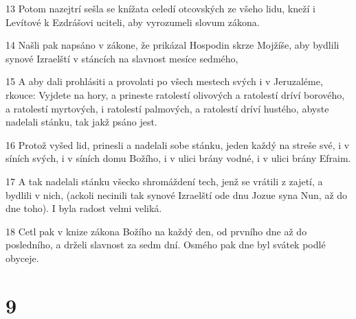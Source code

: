\par 13 Potom nazejtrí sešla se knížata celedí otcovských ze všeho lidu, kneží i Levítové k Ezdrášovi uciteli, aby vyrozumeli slovum zákona.
\par 14 Našli pak napsáno v zákone, že prikázal Hospodin skrze Mojžíše, aby bydlili synové Izraelští v stáncích na slavnost mesíce sedmého,
\par 15 A aby dali prohlásiti a provolati po všech mestech svých i v Jeruzaléme, rkouce: Vyjdete na hory, a prineste ratolestí olivových a ratolestí dríví borového, a ratolestí myrtových, i ratolestí palmových, a ratolestí dríví hustého, abyste nadelali stánku, tak jakž psáno jest.
\par 16 Protož vyšed lid, prinesli a nadelali sobe stánku, jeden každý na streše své, i v síních svých, i v síních domu Božího, i v ulici brány vodné, i v ulici brány Efraim.
\par 17 A tak nadelali stánku všecko shromáždení tech, jenž se vrátili z zajetí, a bydlili v nich, (ackoli necinili tak synové Izraelští ode dnu Jozue syna Nun, až do dne toho). I byla radost velmi veliká.
\par 18 Cetl pak v knize zákona Božího na každý den, od prvního dne až do posledního, a drželi slavnost za sedm dní. Osmého pak dne byl svátek podlé obyceje.

\chapter{9}

